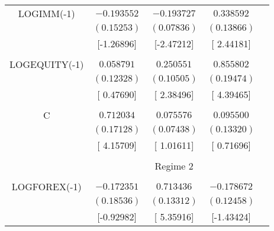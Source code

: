\begin{tabular}{lrrrr}
\multicolumn{1}{c}{LOGIMM(-1)}&\multicolumn{1}{c}{$-0.193552$}&\multicolumn{1}{c}{$-0.193727$}&\multicolumn{1}{c}{$0.338592$}&\multicolumn{1}{c}{}\\
\multicolumn{1}{c}{}&\multicolumn{1}{c}{$(0.15253)$}&\multicolumn{1}{c}{$(0.07836)$}&\multicolumn{1}{c}{$(0.13866)$}&\multicolumn{1}{c}{}\\
\multicolumn{1}{c}{}&\multicolumn{1}{c}{[-1.26896]}&\multicolumn{1}{c}{[-2.47212]}&\multicolumn{1}{c}{[ 2.44181]}&\multicolumn{1}{c}{}\\
\multicolumn{1}{c}{}&\multicolumn{1}{c}{}&\multicolumn{1}{c}{}&\multicolumn{1}{c}{}&\multicolumn{1}{c}{}\\
\multicolumn{1}{c}{LOGEQUITY(-1)}&\multicolumn{1}{c}{$0.058791$}&\multicolumn{1}{c}{$0.250551$}&\multicolumn{1}{c}{$0.855802$}&\multicolumn{1}{c}{}\\
\multicolumn{1}{c}{}&\multicolumn{1}{c}{$(0.12328)$}&\multicolumn{1}{c}{$(0.10505)$}&\multicolumn{1}{c}{$(0.19474)$}&\multicolumn{1}{c}{}\\
\multicolumn{1}{c}{}&\multicolumn{1}{c}{[ 0.47690]}&\multicolumn{1}{c}{[ 2.38496]}&\multicolumn{1}{c}{[ 4.39465]}&\multicolumn{1}{c}{}\\
\multicolumn{1}{c}{}&\multicolumn{1}{c}{}&\multicolumn{1}{c}{}&\multicolumn{1}{c}{}&\multicolumn{1}{c}{}\\
\multicolumn{1}{c}{C}&\multicolumn{1}{c}{$0.712034$}&\multicolumn{1}{c}{$0.075576$}&\multicolumn{1}{c}{$0.095500$}&\multicolumn{1}{c}{}\\
\multicolumn{1}{c}{}&\multicolumn{1}{c}{$(0.17128)$}&\multicolumn{1}{c}{$(0.07438)$}&\multicolumn{1}{c}{$(0.13320)$}&\multicolumn{1}{c}{}\\
\multicolumn{1}{c}{}&\multicolumn{1}{c}{[ 4.15709]}&\multicolumn{1}{c}{[ 1.01611]}&\multicolumn{1}{c}{[ 0.71696]}&\multicolumn{1}{c}{}\\
[4.5pt] \hline \\ [-4.5pt]
\multicolumn{1}{c}{}&\multicolumn{3}{c}{Regime 2}&\multicolumn{1}{c}{}\\
[4.5pt] \hline \\ [-4.5pt]
\multicolumn{1}{c}{LOGFOREX(-1)}&\multicolumn{1}{c}{$-0.172351$}&\multicolumn{1}{c}{$0.713436$}&\multicolumn{1}{c}{$-0.178672$}&\multicolumn{1}{c}{}\\
\multicolumn{1}{c}{}&\multicolumn{1}{c}{$(0.18536)$}&\multicolumn{1}{c}{$(0.13312)$}&\multicolumn{1}{c}{$(0.12458)$}&\multicolumn{1}{c}{}\\
\multicolumn{1}{c}{}&\multicolumn{1}{c}{[-0.92982]}&\multicolumn{1}{c}{[ 5.35916]}&\multicolumn{1}{c}{[-1.43424]}&\multicolumn{1}{c}{}\\

\end{tabular}
